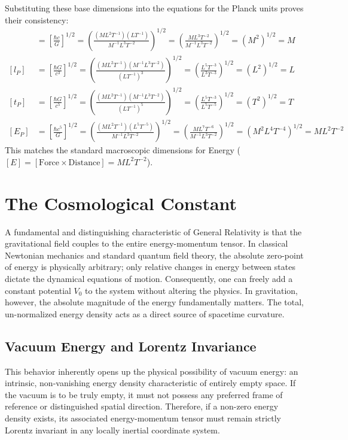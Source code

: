 \documentclass[11pt, a4paper]{report}
\begin{document}
Substituting these base dimensions into the equations for the Planck units proves their consistency:
\begin{align}
[m_{P}] &= \left[ \frac{\hbar c}{G} \right]^{1/2} = \left( \frac{(M L^{2} T^{-1})(L T^{-1})}{M^{-1} L^{3} T^{-2}} \right)^{1/2} = \left( \frac{M L^{3} T^{-2}}{M^{-1} L^{3} T^{-2}} \right)^{1/2} = (M^{2})^{1/2} = M \\
[l_{P}] &= \left[ \frac{\hbar G}{c^{3}} \right]^{1/2} = \left( \frac{(M L^{2} T^{-1})(M^{-1} L^{3} T^{-2})}{(L T^{-1})^{3}} \right)^{1/2} = \left( \frac{L^{5} T^{-3}}{L^{3} T^{-3}} \right)^{1/2} = (L^{2})^{1/2} = L \\
[t_{P}] &= \left[ \frac{\hbar G}{c^{5}} \right]^{1/2} = \left( \frac{(M L^{2} T^{-1})(M^{-1} L^{3} T^{-2})}{(L T^{-1})^{5}} \right)^{1/2} = \left( \frac{L^{5} T^{-3}}{L^{5} T^{-5}} \right)^{1/2} = (T^{2})^{1/2} = T \\
[E_{P}] &= \left[ \frac{\hbar c^{5}}{G} \right]^{1/2} = \left( \frac{(M L^{2} T^{-1})(L^{5} T^{-5})}{M^{-1} L^{3} T^{-2}} \right)^{1/2} = \left( \frac{M L^{7} T^{-6}}{M^{-1} L^{3} T^{-2}} \right)^{1/2} = (M^{2} L^{4} T^{-4})^{1/2} = M L^{2} T^{-2}
\end{align}
\noindent This matches the standard macroscopic dimensions for Energy ($[E] = [\text{Force} \times \text{Distance}] = M L^{2} T^{-2}$).


\section{The Cosmological Constant}

A fundamental and distinguishing characteristic of General Relativity is that the gravitational field couples to the entire energy-momentum tensor. In classical Newtonian mechanics and standard quantum field theory, the absolute zero-point of energy is physically arbitrary; only relative changes in energy between states dictate the dynamical equations of motion. Consequently, one can freely add a constant potential $V_0$ to the system without altering the physics. In gravitation, however, the absolute magnitude of the energy fundamentally matters. The total, un-normalized energy density acts as a direct source of spacetime curvature.

\subsection{Vacuum Energy and Lorentz Invariance}

This behavior inherently opens up the physical possibility of vacuum energy: an intrinsic, non-vanishing energy density characteristic of entirely empty space. If the vacuum is to be truly empty, it must not possess any preferred frame of reference or distinguished spatial direction. Therefore, if a non-zero energy density exists, its associated energy-momentum tensor must remain strictly Lorentz invariant in any locally inertial coordinate system.
\end{document}
